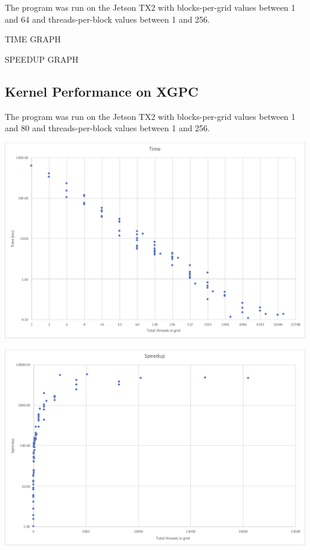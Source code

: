 \documentclass[a4paper,12pt]{article}
\begin{document}
The program was run on the Jetson TX2 with blocks-per-grid values between 1 and 64 and threads-per-block values between 1 and 256.

TIME GRAPH

SPEEDUP GRAPH

\subsection{Kernel Performance on XGPC}
The program was run on the Jetson TX2 with blocks-per-grid values between 1 and 80 and threads-per-block values between 1 and 256.

\begin{center}
  \includegraphics[width=\linewidth]{xgpc-time}
\end{center}

\begin{center}
  \includegraphics[width=\linewidth]{xgpc-speedup}
\end{center}
\end{document}
